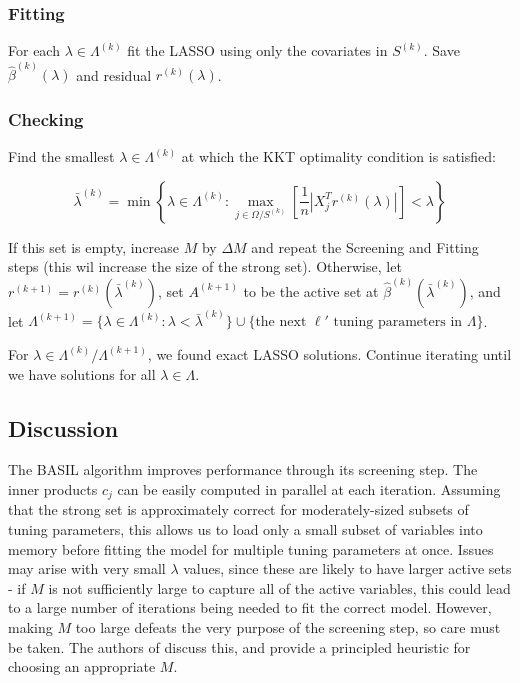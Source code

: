 \documentclass{amsart}
\begin{document}
\subsubsection{Fitting} For each $\lambda \in \Lambda^{(k)}$ fit the LASSO using
only the covariates in $S^{(k)}$. Save $\hat{\beta}^{(k)}(\lambda)$ and residual
$r^{(k)}(\lambda)$.

\subsubsection{Checking} Find the smallest $\lambda \in \Lambda^{(k)}$ at which
the KKT optimality condition is satisfied:

$$\bar{\lambda}^{(k)} = \min \left\{\lambda \in \Lambda^{(k)} : \max_{j \in \Omega /
S^{(k)}} \left[\frac1n|X_j^Tr^{(k)}(\lambda)| \right] < \lambda \right\}$$

If this set is empty, increase $M$ by $\Delta M$ and repeat the Screening and
Fitting steps (this wil increase the size of the strong set). Otherwise, let
$r^{(k+1)} = r^{(k)}(\bar{\lambda}^{(k)})$, set $A^{(k+1)}$ to be the active set
at $\hat{\beta}^{(k)}(\bar{\lambda}^{(k)})$, and let $\Lambda^{(k+1)} = \{
\lambda \in \Lambda^{(k)} : \lambda < \bar{\lambda}^{(k)} \} \cup \{\textrm{the
next  } \ell' \textrm{  tuning parameters in  } \Lambda \}$. 

\bigskip

For $\lambda \in
\Lambda^{(k)} / \Lambda^{(k+1)}$, we found exact LASSO solutions. Continue
iterating until we have solutions for all $\lambda \in \Lambda$. 

\subsection{Discussion}

The BASIL algorithm improves performance through its screening step.
The inner products $c_j$ can be easily computed in parallel at each iteration.
Assuming that the strong set is approximately correct for moderately-sized
subsets of tuning parameters, this allows us to load only a small subset of
variables into memory before fitting the model for multiple tuning parameters at
once. Issues may arise with very small $\lambda$ values, since these are likely
to have larger active sets - if $M$ is not sufficiently large to capture all of
the active variables, this could lead to a large number of iterations being
needed to fit the correct model. However, making $M$ too large defeats the very
purpose of the screening step, so care must be taken. The authors of
\cite{qian_fast_2020} discuss this, and provide a principled heuristic for
choosing an appropriate $M$. 



\end{document}
